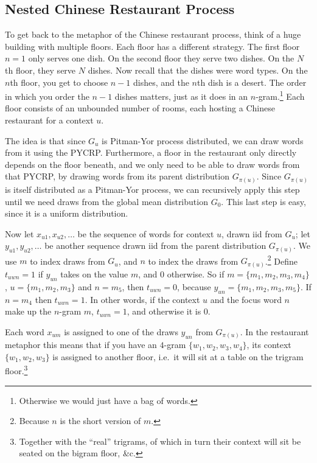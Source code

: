 \subsection{Nested Chinese Restaurant Process}
To get back to the metaphor of the Chinese restaurant process, think of a huge building with multiple floors. Each floor has a different strategy. The first floor $n=1$ only serves one dish. On the second floor they serve two dishes. On the $N$th floor, they serve $N$ dishes. Now recall that the dishes were word types. On the $n$th floor, you get to choose $n-1$ dishes, and the $n$th dish is a desert. The order in which you order the $n-1$ dishes matters, just as it does in an $n$-gram.\footnote{Otherwise we would just have a bag of words.} Each floor consists of an unbounded number of rooms, each hosting a Chinese restaurant for a context $u$.

The idea is that since $G_u$ is Pitman-Yor process distributed, we can draw words from it using the PYCRP. Furthermore, a floor in the restaurant only directly depends on the floor beneath, and we only need to be able to draw words from that PYCRP, by drawing words from its parent distribution $G_{\pi(u)}$. Since $G_{\pi(u)}$ is itself distributed as a Pitman-Yor process, we can recursively apply this step until we need draws from the global mean distribution $G_0$. This last step is easy, since it is a uniform distribution.

Now let $x_{u1},x_{u2},\ldots$ be the sequence of words for context $u$, drawn iid from $G_u$; let $y_{u1},y_{u2},\ldots$ be another sequence drawn iid from the parent distribution $G_{\pi(u)}$. We use $m$ to index draws from $G_u$, and $n$ to index the draws from $G_{\pi(u)}$.\footnote{Because $n$ is the short version of $m$.} Define $t_{uwn}=1$ if $y_{un}$ takes on the value $m$, and $0$ otherwise. So if $m=\{m_1, m_2, m_3, m_4\}$, $u=\{m_1, m_2, m_3\}$ and $n=m_5$, then $t_{uwn} = 0$, because $y_{un} = \{m_1,m_2,m_3,m_5\}$. If $n=m_4$ then $t_{uwn} = 1$. In other words, if the context $u$ and the focus word $n$ make up the $n$-gram $m$, $t_{uwn} =1$, and otherwise it is $0$.

Each word $x_{um}$ is assigned to one of the draws $y_{un}$ from $G_{\pi(u)}$. In the restaurant metaphor this means that if you have an $4$-gram $\{w_1,w_2,w_3,w_4\}$, its context $\{w_1,w_2,w_3\}$ is assigned to another floor, i.e.~it will sit at a table on the trigram floor.\footnote{Together with the ``real'' trigrams, of which in turn their context will sit be seated on the bigram floor, \&c.}

